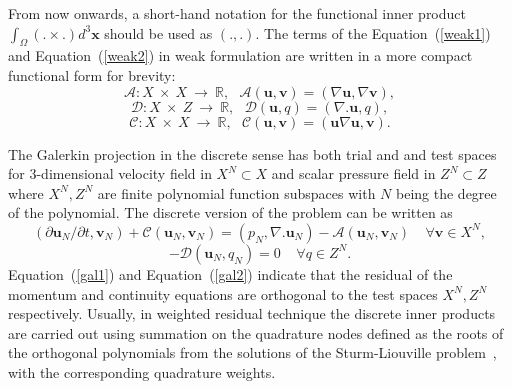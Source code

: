 \documentclass[times]{fldauth}
\begin{document}
From now onwards, a short-hand notation for the functional inner product $\int_{\Omega}(.\times .)d^{3}\mathbf{x}$ should be used as $(. , .)$. The terms of the Equation~(\ref{weak1}) and Equation~(\ref{weak2}) in weak formulation are written in a more compact functional form for brevity:
\begin{equation}
\mathcal{A} : X \ \times \ X \ \rightarrow \ \mathbb{R}, \ \ \ \mathcal{A}(\mathbf{u},\mathbf{v}) = (\nabla\mathbf{u},\nabla\mathbf{v}),
\end{equation}
\begin{equation}
\mathcal{D} : X \ \times \ Z \ \rightarrow \ \mathbb{R},\ \ \ \mathcal{D}(\mathbf{u},q) = (\nabla.\mathbf{u},q),
\end{equation}
\begin{equation}
\mathcal{C} : X \ \times \ X \ \rightarrow \ \mathbb{R},\ \ \  \mathcal{C}(\mathbf{u},\mathbf{v}) = (\mathbf{u}\nabla\mathbf{u},\mathbf{v}).
\end{equation}

The Galerkin projection in the discrete sense has both trial and and test spaces for 3-dimensional velocity field in $X^N \subset X$ and scalar pressure field in $Z^N \subset Z$ where $X^{N}, Z^{N}$ are finite polynomial function subspaces with $N$ being the degree of the polynomial. 
The discrete version of the problem can be written as 
\begin{equation}
(\partial\mathbf{u}_N/\partial t,\mathbf{v}_N) + \mathcal{C}(\mathbf{u}_N,\mathbf{v}_N) = (p_N,\nabla.\mathbf{u}_N) - \mathcal{A}(\mathbf{u}_N,\mathbf{v}_N) \ \ \ \ \ \forall\mathbf{v}\in X^{N}, \label{gal1}
\end{equation}
\begin{equation}
-\mathcal{D}(\mathbf{u}_N,q_N) = 0\ \ \ \ \ \forall q\in Z^{N}. \label{gal2}
\end{equation}
Equation~(\ref{gal1}) and Equation~(\ref{gal2}) indicate that the residual of the momentum and continuity equations are orthogonal to the test spaces $X^{N}, Z^{N}$ respectively.
Usually, in weighted residual technique the discrete inner products are carried out using summation on the quadrature nodes defined as the roots of the orthogonal polynomials from the solutions of the Sturm-Liouville problem~\cite{sturm2}, with the corresponding quadrature weights.
\end{document}
